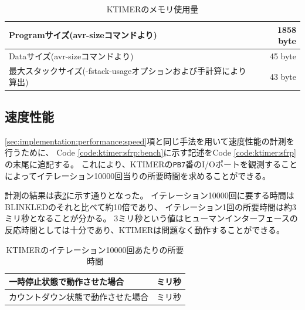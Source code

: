 \begin{table}[h]
  \centering
  \begin{tabular}{l|r}
    Programサイズ(avr-sizeコマンドより) & 1858 byte \\ \hline
    Dataサイズ(avr-sizeコマンドより) & 45 byte \\ \hline
    最大スタックサイズ(-fstack-usageオプションおよび手計算により算出)  & 43 byte \\ \hline
  \end{tabular}
\caption{KTIMERのメモリ使用量}
\label{fig:ktimer:size}
\end{table}

\subsection{速度性能}
\ref{sec:implementation:performance:speed}項と同じ手法を用いて速度性能の計測を行うために、
Code \ref{code:ktimer:sfrp:bench}に示す記述をCode \ref{code:ktimer:sfrp}の末尾に追記する。
これにより、KTIMERの\texttt{PB7}番のI/Oポートを観測することによってイテレーション10000回当りの所要時間を求めることができる。

計測の結果は表\ref{fig:ktimer:time}に示す通りとなった。
イテレーション10000回に要する時間はBLINKLEDのそれと比べて約10倍であり、
イテレーション1回の所要時間は約3ミリ秒となることが分かる。
3ミリ秒という値はヒューマンインターフェースの反応時間としては十分であり、KTIMERは問題なく動作することができる。



\begin{table}[h]
  \centering
  \begin{tabular}{l|r}
    一時停止状態で動作させた場合 &  ミリ秒 \\ \hline
    カウントダウン状態で動作させた場合 &  ミリ秒 \\ \hline
  \end{tabular}
\caption{KTIMERのイテレーション10000回あたりの所要時間}
\label{fig:ktimer:time}
\end{table}
